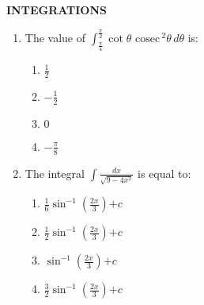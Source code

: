 \documentclass[12pt,-letter paper]{article}
\newcommand{\cosec}{\,\text{cosec}\,}
\providecommand{\brak}[1]{\ensuremath{\left(#1\right)}}
\begin{document}
\begin{center}                                                                      \textbf{INTEGRATIONS}                        \end{center}                                                                                                                                    \begin{enumerate}                                                               \item The value of  \(\int_{\frac{\pi}{4}}^{\frac{\pi}{2}} \cot \theta \, \cosec^2 \theta \, d\theta\) is:                                      \begin{enumerate}[label={$\brak{\Alph*}$}]                                                                              \item $\frac{1}{2}$
                                                        \item $ -\frac{1
}{2} $

                \item $ 0 $                                                                                                                                                     \item $ -\frac{\pi}{8} $                                                                                                                                    \end{enumerate}                                                                                                                                                             \item The integral $ \int \frac{dx}{\sqrt{9-4x^2}} $ is equal to:                                                                                                                                                                               \begin{enumerate}[label={$\brak{\Alph*}$}]
                                                                                                                                                        \item $ \frac{1}{6} \sin^{-1} $\brak{\frac{2x}{3}}$ + c $       

    \item $ \frac{1}{2} \sin^{-1} $\brak{\frac{2x}{3}}$ + c $
                                                                                                                                                
        \item $\sin^{-1} $\brak{ \frac{2x}{3}}$ + c $                           \item $ \frac{3}{2} \sin^{-1} $\brak{ \frac{2x}{3} }$ + c $                                                                             

\end{enumerate}
\end{enumerate}
\end{document}
